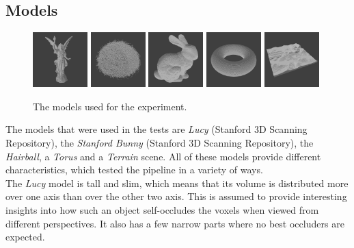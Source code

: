 \subsection*{Models} \label{subsec-models}

\begin{figure}[h]
  \centering
  \includegraphics[width=80px]{images/graphics/model-lucy.jpg}
  \includegraphics[width=80px]{images/graphics/model-hairball.jpg}
  \includegraphics[width=80px]{images/graphics/model-bunny.jpg}
  \includegraphics[width=80px]{images/graphics/model-torus.jpg}
  \includegraphics[width=80px]{images/graphics/model-terrain.jpg}
  \caption{The models used for the experiment.}
  \label{fig:experiment-models}
\end{figure}

\noindent
The models that were used in the tests are \emph{Lucy} (Stanford 3D Scanning Repository), the \emph{Stanford Bunny} 
(Stanford 3D Scanning Repository), the \emph{Hairball}, a \emph{Torus} and a \emph{Terrain} scene. All of 
these models provide different characteristics, which tested the pipeline in a variety of ways. \\

\noindent
The \emph{Lucy} model is tall and slim, which means that its volume is distributed more over one axis 
than over the other two axis. This is assumed to provide interesting insights into how such an object 
self-occludes the voxels when viewed from different perspectives. It also has a few narrow parts where 
no best occluders are expected. \\

